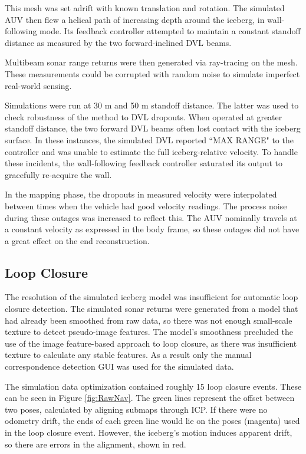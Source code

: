 This mesh was set adrift with known translation and rotation. The simulated AUV then flew a helical path of increasing depth around the iceberg, in wall-following mode. Its feedback controller attempted to maintain a constant standoff distance as measured by the two forward-inclined DVL beams.

Multibeam sonar range returns were then generated via ray-tracing on the mesh. These measurements could be corrupted with random noise to simulate imperfect real-world sensing. 

Simulations were run at 30 m and 50 m standoff distance. The latter was used to check robustness of the method to DVL dropouts. When operated at greater standoff distance, the two forward DVL beams often lost contact with the iceberg surface. In these instances, the simulated DVL reported ``MAX RANGE" to the controller and was unable to estimate the full iceberg-relative velocity. To handle these incidents, the wall-following feedback controller saturated its output to gracefully re-acquire the wall. 

In the mapping phase, the dropouts in measured velocity were interpolated between times when the vehicle had good velocity readings. The process noise during these outages was increased to reflect this. The AUV nominally travels at a constant velocity as expressed in the body frame, so these outages did not have a great effect on the end reconstruction.

\subsection{Loop Closure}

The resolution of the simulated iceberg model was insufficient for automatic loop closure detection. The simulated sonar returns were generated from a model that had already been smoothed from raw data, so there was not enough small-scale texture to detect pseudo-image features. The model's smoothness precluded the use of the image feature-based approach to loop closure, as there was insufficient texture to calculate any stable features. As a result only the manual correspondence detection GUI was used for the simulated data. 

The simulation data optimization contained roughly 15 loop closure events. These can be seen in Figure \ref{fig:RawNav}. The green lines represent the offset between two poses, calculated by aligning submaps through ICP. If there were no odometry drift, the ends of each green line would lie on the poses (magenta) used in the loop closure event. However, the iceberg's motion induces apparent drift, so there are errors in the alignment, shown in red.

